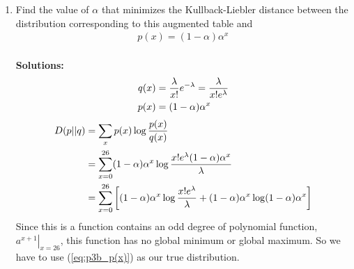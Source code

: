 \documentclass{assignment}
\begin{document}
\begin{enumerate}
\begin{enumerate}
  \item Find the value of $\alpha$ that minimizes the Kullback-Liebler distance between the distribution corresponding
    to this augmented table and
    \begin{align}
      p(x) = (1-\alpha) \alpha^x \label{eq:p3b_p(x)}
    \end{align}
    $$ $$ \\
    \textbf{Solutions:}\\
    \begin{align*}
      q(x) & = \dfrac{\lambda}{x!}e^{-\lambda} = \dfrac{\lambda}{x! e^{\lambda}} \\
      p(x) & = (1-\alpha) \alpha^x
    \end{align*}
    \begin{align*}
      D(p||q) & = \sum_x p(x)\log \dfrac{p(x)}{q(x)}\\
              & = \sum_{x=0}^{26} (1-\alpha) \alpha^x \log \dfrac{x!e^{\lambda}(1-\alpha) \alpha^x}{\lambda} \\
              & = \sum_{x=0}^{26} \left[(1-\alpha) \alpha^x\log \dfrac{x!e^{\lambda}}{\lambda}
                + (1-\alpha) \alpha^x\log (1-\alpha) \alpha^x\right]
    \end{align*}
    Since this is a function contains an odd degree of polynomial function, $\left.a^{x+1}\right|_{x=26}$, this function
    has no global minimum or global maximum. So we have to use (\ref{eq:p3b_p(x)}) as our true distribution.


\end{enumerate}
\end{enumerate}
\end{document}
